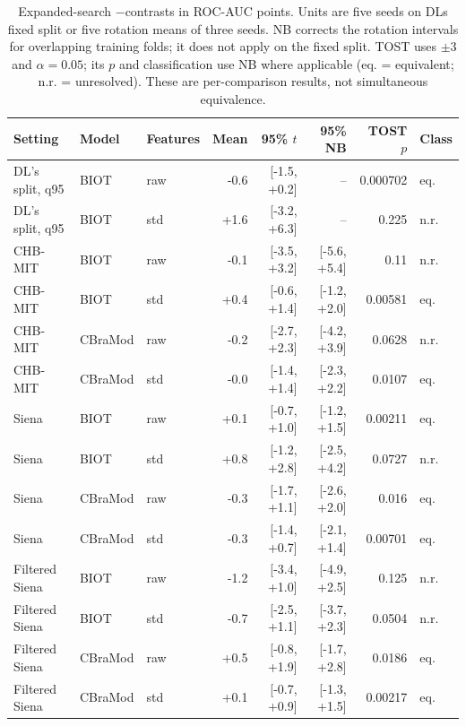\begin{table}[!htbp]
\caption{Expanded-search \lastarm$-$\lastnoise contrasts in ROC-AUC points. Units are five seeds on DL\textquotesingle s fixed split or five rotation means of three seeds. NB corrects the rotation intervals for overlapping training folds; it does not apply on the fixed split. TOST uses $\pm3$ and $\alpha=0.05$; its $p$ and classification use NB where applicable (eq. = equivalent; n.r. = unresolved). These are per-comparison results, not simultaneous equivalence.}
\label{tab:d28b}
\centering\footnotesize
\setlength{\tabcolsep}{3pt}
\begin{tabular}{lllrrrrl}
\toprule
Setting & Model & Features & Mean & 95\% $t$ & 95\% NB & TOST $p$ & Class\\
\midrule
DL's split, q95 & BIOT & raw & -0.6 & [-1.5, +0.2] & -- & 0.000702 & eq.\\
DL's split, q95 & BIOT & std & +1.6 & [-3.2, +6.3] & -- & 0.225 & n.r.\\
CHB-MIT & BIOT & raw & -0.1 & [-3.5, +3.2] & [-5.6, +5.4] & 0.11 & n.r.\\
CHB-MIT & BIOT & std & +0.4 & [-0.6, +1.4] & [-1.2, +2.0] & 0.00581 & eq.\\
CHB-MIT & CBraMod & raw & -0.2 & [-2.7, +2.3] & [-4.2, +3.9] & 0.0628 & n.r.\\
CHB-MIT & CBraMod & std & -0.0 & [-1.4, +1.4] & [-2.3, +2.2] & 0.0107 & eq.\\
Siena & BIOT & raw & +0.1 & [-0.7, +1.0] & [-1.2, +1.5] & 0.00211 & eq.\\
Siena & BIOT & std & +0.8 & [-1.2, +2.8] & [-2.5, +4.2] & 0.0727 & n.r.\\
Siena & CBraMod & raw & -0.3 & [-1.7, +1.1] & [-2.6, +2.0] & 0.016 & eq.\\
Siena & CBraMod & std & -0.3 & [-1.4, +0.7] & [-2.1, +1.4] & 0.00701 & eq.\\
Filtered Siena & BIOT & raw & -1.2 & [-3.4, +1.0] & [-4.9, +2.5] & 0.125 & n.r.\\
Filtered Siena & BIOT & std & -0.7 & [-2.5, +1.1] & [-3.7, +2.3] & 0.0504 & n.r.\\
Filtered Siena & CBraMod & raw & +0.5 & [-0.8, +1.9] & [-1.7, +2.8] & 0.0186 & eq.\\
Filtered Siena & CBraMod & std & +0.1 & [-0.7, +0.9] & [-1.3, +1.5] & 0.00217 & eq.\\
\bottomrule
\end{tabular}
\end{table}
